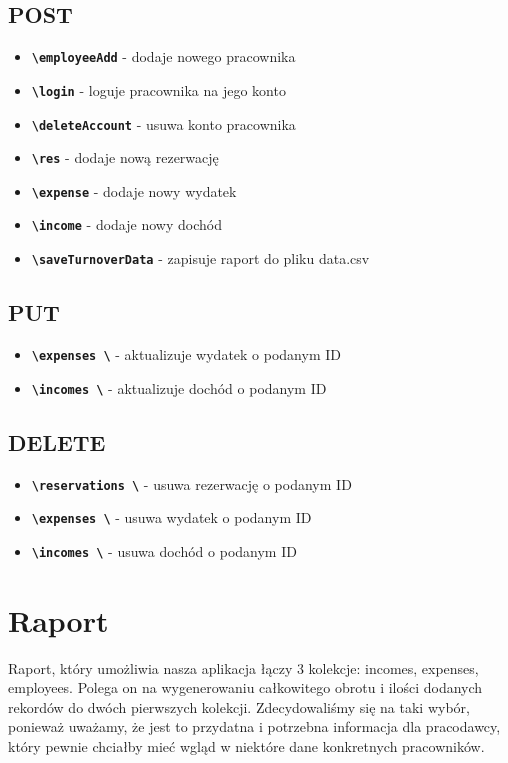 \documentclass[12pt]{article}
\begin{document}
\subsection{POST}
\begin{itemize}
    \item \textbf{\texttt{\textbackslash employeeAdd}} - dodaje nowego pracownika
    \item \textbf{\texttt{\textbackslash login}} - loguje pracownika na jego konto
    \item \textbf{\texttt{\textbackslash deleteAccount}} - usuwa konto pracownika
    \item \textbf{\texttt{\textbackslash res}} - dodaje nową rezerwację
    \item \textbf{\texttt{\textbackslash expense}} - dodaje nowy wydatek
    \item \textbf{\texttt{\textbackslash income}} - dodaje nowy dochód
    \item \textbf{\texttt{\textbackslash saveTurnoverData}} - zapisuje raport do pliku data.csv
\end{itemize}


\subsection{PUT}
\begin{itemize}
    \item \textbf{\texttt{\textbackslash expenses \textbackslash}} - aktualizuje wydatek o podanym ID
    \item \textbf{\texttt{\textbackslash incomes \textbackslash}} - aktualizuje dochód o podanym ID
\end{itemize}


\subsection{DELETE}
\begin{itemize}
    \item \textbf{\texttt{\textbackslash reservations \textbackslash}} - usuwa rezerwację o podanym ID
    \item \textbf{\texttt{\textbackslash expenses \textbackslash}} - usuwa wydatek o podanym ID
    \item \textbf{\texttt{\textbackslash incomes \textbackslash}} - usuwa dochód o podanym ID
\end{itemize}

\newpage
\section{Raport}
Raport, który umożliwia nasza aplikacja łączy 3 kolekcje: incomes, expenses, employees. Polega on na wygenerowaniu całkowitego obrotu i ilości dodanych rekordów do dwóch pierwszych kolekcji. Zdecydowaliśmy się na taki wybór, ponieważ uważamy, że jest to przydatna i potrzebna informacja dla pracodawcy, który pewnie chciałby mieć wgląd w niektóre dane konkretnych pracowników.
\end{document}

